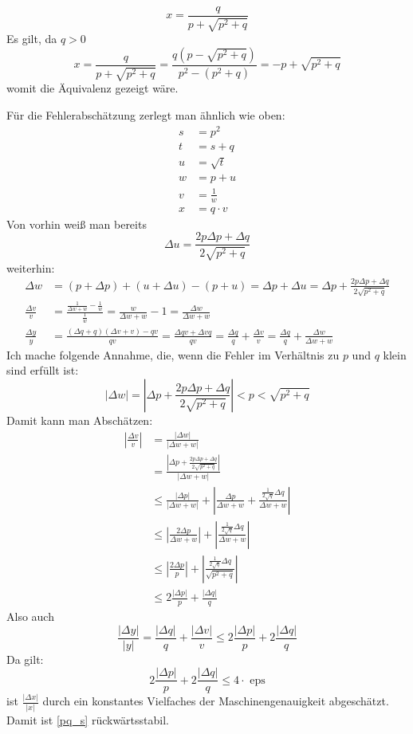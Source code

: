 \documentclass[a4paper]{scrartcl}
\begin{document}
\begin{aufgabe}
	\begin{equation}
		\label{pq_s}
		x=\frac q{p+\sqrt{p^2+q}}
	\end{equation}
	Es gilt, da $q>0$
	\[
		x=\frac q{p+\sqrt{p^2+q}}=\frac{q(p-\sqrt{p^2+q})}{p^2-(p^2+q)}=-p+\sqrt{p^2+q}
	\]
	womit die Äquivalenz gezeigt wäre.

	Für die Fehlerabschätzung zerlegt man ähnlich wie oben:
	\begin{align*}
		s&=p^2\\
		t&=s +q\\
		u&=\sqrt{t}\\
		w&=p+u\\
		v&=\frac 1w\\
		x&=q\cdot v
	\end{align*}
	Von vorhin weiß man bereits
	\[
		\Delta u=\frac{2p\Delta p+\Delta q}{2\sqrt{p^2+q}}
	\]
	weiterhin:
	\begin{align*}
		\Delta w&=(p + \Delta p)+(u + \Delta u)-(p+u)=\Delta p + \Delta u =\Delta p+\frac{2p\Delta p+\Delta q}{2\sqrt{p^2+q}}\\
\frac{\Delta v}v&=\frac{\frac{1}{\Delta w + w}-\frac 1w}{\frac 1w}=\frac w{\Delta w + w}-1=\frac{\Delta w}{\Delta w +w}\\
  \frac {\Delta y}y&=\frac{(\Delta q + q)(\Delta v +v)-qv}{qv}=\frac{\Delta qv+\Delta vq}{qv}=\frac {\Delta q}q+\frac {\Delta v}v = \frac {\Delta q}q + \frac{\Delta w}{\Delta w + w}
	\end{align*}
	Ich mache folgende Annahme, die, wenn die Fehler im Verhältnis zu $p$ und $q$ klein sind erfüllt ist:
	\[
		|\Delta w|=\left|\Delta p+\frac{2p\Delta p+\Delta q}{2\sqrt{p^2+q}}\right|<p<\sqrt{p^2+q}
	\]
	Damit kann man Abschätzen:
	\begin{align*}
		\left|\frac{\Delta v}v\right| &= \frac{|\Delta w|}{|\Delta w + w|}\\
								&=\frac{\left|\Delta p+\frac{2p\Delta p+\Delta q}{2\sqrt{p^2+q}}\right|}
		{|\Delta w + w|}\\%
		&\le \frac{|\Delta p|}{|\Delta w +w|}+\left|\frac{\Delta p}{\Delta w +w}+\frac {\frac 1{2\sqrt q}\Delta q}{\Delta w + w}\right|\\
		&\le \left|\frac{2\Delta p}{\Delta w + w}\right|+\left|\frac{\frac 1{2\sqrt{q}}\Delta q}{\Delta w+w}\right|\\
		&\le \left|\frac{2\Delta p}{p}\right|+\left|\frac{\frac 1{2\sqrt{q}}\Delta q}{\sqrt{p^2+q}}\right|\\
		&\le 2\frac{|\Delta p|}{p}+\frac{|\Delta q|}{q}
	\end{align*}
	Also auch
	\[
		\frac{|\Delta y|}{|y|}=\frac {|\Delta q|}q+\frac{|\Delta v|}v\le 2\frac{|\Delta p|}{p}+2\frac{|\Delta q|}{q}
	\]
	Da gilt:
	\[
		2\frac{|\Delta p|}p+2\frac{|\Delta q|}q\le 4\cdot \text{ eps}
	\]
	ist $\frac{|\Delta x|}{|x|}$ durch ein konstantes Vielfaches der Maschinengenauigkeit abgeschätzt.
	Damit ist \eqref{pq_s} rückwärtsstabil.
\end{aufgabe}
\end{document}
